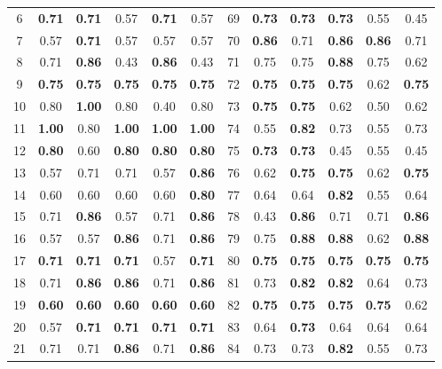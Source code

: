 \documentclass{article}
\begin{document}
{\begin{longtable}{cccccc@{\qquad}cccccc}
6 & \textbf{0.71} & \textbf{0.71} & 0.57 & \textbf{0.71} & 0.57 & 69 & \textbf{0.73} & \textbf{0.73} & \textbf{0.73} & 0.55 & 0.45 \\
7 & 0.57 & \textbf{0.71} & 0.57 & 0.57 & 0.57 & 70 & \textbf{0.86} & 0.71 & \textbf{0.86} & \textbf{0.86} & 0.71 \\
8 & 0.71 & \textbf{0.86} & 0.43 & \textbf{0.86} & 0.43 & 71 & 0.75 & 0.75 & \textbf{0.88} & 0.75 & 0.62 \\
9 & \textbf{0.75} & \textbf{0.75} & \textbf{0.75} & \textbf{0.75} & \textbf{0.75} & 72 & \textbf{0.75} & \textbf{0.75} & \textbf{0.75} & 0.62 & \textbf{0.75} \\
10 & 0.80 & \textbf{1.00} & 0.80 & 0.40 & 0.80 & 73 & \textbf{0.75} & \textbf{0.75} & 0.62 & 0.50 & 0.62 \\
11 & \textbf{1.00} & 0.80 & \textbf{1.00} & \textbf{1.00} & \textbf{1.00} & 74 & 0.55 & \textbf{0.82} & 0.73 & 0.55 & 0.73 \\
12 & \textbf{0.80} & 0.60 & \textbf{0.80} & \textbf{0.80} & \textbf{0.80} & 75 & \textbf{0.73} & \textbf{0.73} & 0.45 & 0.55 & 0.45 \\
13 & 0.57 & 0.71 & 0.71 & 0.57 & \textbf{0.86} & 76 & 0.62 & \textbf{0.75} & \textbf{0.75} & 0.62 & \textbf{0.75} \\
14 & 0.60 & 0.60 & 0.60 & 0.60 & \textbf{0.80} & 77 & 0.64 & 0.64 & \textbf{0.82} & 0.55 & 0.64 \\
15 & 0.71 & \textbf{0.86} & 0.57 & 0.71 & \textbf{0.86} & 78 & 0.43 & \textbf{0.86} & 0.71 & 0.71 & \textbf{0.86} \\
16 & 0.57 & 0.57 & \textbf{0.86} & 0.71 & \textbf{0.86} & 79 & 0.75 & \textbf{0.88} & \textbf{0.88} & 0.62 & \textbf{0.88} \\
17 & \textbf{0.71} & \textbf{0.71} & \textbf{0.71} & 0.57 & \textbf{0.71} & 80 & \textbf{0.75} & \textbf{0.75} & \textbf{0.75} & \textbf{0.75} & \textbf{0.75} \\
18 & 0.71 & \textbf{0.86} & \textbf{0.86} & 0.71 & \textbf{0.86} & 81 & 0.73 & \textbf{0.82} & \textbf{0.82} & 0.64 & 0.73 \\
19 & \textbf{0.60} & \textbf{0.60} & \textbf{0.60} & \textbf{0.60} & \textbf{0.60} & 82 & \textbf{0.75} & \textbf{0.75} & \textbf{0.75} & \textbf{0.75} & 0.62 \\
20 & 0.57 & \textbf{0.71} & \textbf{0.71} & \textbf{0.71} & \textbf{0.71} & 83 & 0.64 & \textbf{0.73} & 0.64 & 0.64 & 0.64 \\
21 & 0.71 & 0.71 & \textbf{0.86} & 0.71 & \textbf{0.86} & 84 & 0.73 & 0.73 & \textbf{0.82} & 0.55 & 0.73 \\

\end{longtable}}
\end{document}
